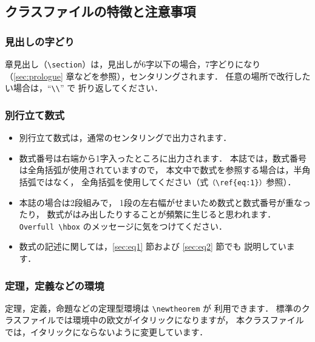 \documentclass[paper]{jrsj}    %
\begin{document}
\subsection{クラスファイルの特徴と注意事項}

\subsubsection{見出しの字どり}

章見出し（\verb/\section/）は，見出しが6字以下の場合，7字どりになり
（\ref{sec:prologue} 章などを参照），センタリングされます．
任意の場所で改行したい場合は，``\verb/\\/'' で
折り返してください．

\subsubsection{別行立て数式}

\begin{itemize}
\item
別行立て数式は，通常のセンタリングで出力されます．

\item
数式番号は右端から1字入ったところに出力されます．
本誌では，数式番号は全角括弧が使用されていますので，
本文中で数式を参照する場合は，半角括弧ではなく，
全角括弧を使用してください（式\verb/（\ref{eq:1}）/参照）．

\item
本誌の場合は2段組みで，
1段の左右幅がせまいため数式と数式番号が重なったり，
数式がはみ出したりすることが頻繁に生じると思われます．
\verb/Overfull \hbox/ のメッセージに気をつけてください．

\item
数式の記述に関しては，\ref{sec:eq1} 節および \ref{sec:eq2} 節でも
説明しています．
\end{itemize}

\subsubsection{定理，定義などの環境}

定理，定義，命題などの定理型環境は \verb/\newtheorem/ が
利用できます\cite{latex}．
標準のクラスファイルでは環境中の欧文がイタリックになりますが，
本クラスファイルでは，イタリックにならないように変更しています．
\end{document}
